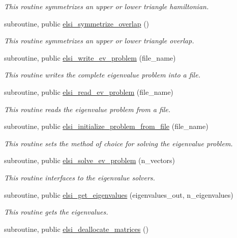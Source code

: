 \begin{DoxyCompactItemize}
\begin{DoxyCompactList}\small\item\em This routine symmetrizes an upper or lower triangle hamiltonian. \end{DoxyCompactList}\item 
subroutine, public \hyperlink{namespaceelsi_a3c35d92aec96439594184b3488436b9a}{elsi\+\_\+symmetrize\+\_\+overlap} ()
\begin{DoxyCompactList}\small\item\em This routine symmetrizes an upper or lower triangle overlap. \end{DoxyCompactList}\item 
subroutine, public \hyperlink{namespaceelsi_acfc3cef5687edefbba8170aa3c957c0f}{elsi\+\_\+write\+\_\+ev\+\_\+problem} (file\+\_\+name)
\begin{DoxyCompactList}\small\item\em This routine writes the complete eigenvalue problem into a file. \end{DoxyCompactList}\item 
subroutine, public \hyperlink{namespaceelsi_a05effde2e85df40e63ba3ff519dc457b}{elsi\+\_\+read\+\_\+ev\+\_\+problem} (file\+\_\+name)
\begin{DoxyCompactList}\small\item\em This routine reads the eigenvalue problem from a file. \end{DoxyCompactList}\item 
subroutine, public \hyperlink{namespaceelsi_a8d4e07912d425d778af75fee646a724f}{elsi\+\_\+initialize\+\_\+problem\+\_\+from\+\_\+file} (file\+\_\+name)
\begin{DoxyCompactList}\small\item\em This routine sets the method of choice for solving the eigenvalue problem. \end{DoxyCompactList}\item 
subroutine, public \hyperlink{namespaceelsi_af3291953e595197b4c492d176859d83d}{elsi\+\_\+solve\+\_\+ev\+\_\+problem} (n\+\_\+vectors)
\begin{DoxyCompactList}\small\item\em This routine interfaces to the eigenvalue solvers. \end{DoxyCompactList}\item 
subroutine, public \hyperlink{namespaceelsi_ad9a7ad318a1e7f570bfa2e64428b53f9}{elsi\+\_\+get\+\_\+eigenvalues} (eigenvalues\+\_\+out, n\+\_\+eigenvalues)
\begin{DoxyCompactList}\small\item\em This routine gets the eigenvalues. \end{DoxyCompactList}\item 
\hypertarget{namespaceelsi_a499852f3083dae7991092915ef2dc5b2}{}subroutine, public \hyperlink{namespaceelsi_a499852f3083dae7991092915ef2dc5b2}{elsi\+\_\+deallocate\+\_\+matrices} ()\label{namespaceelsi_a499852f3083dae7991092915ef2dc5b2}


\end{DoxyCompactItemize}
